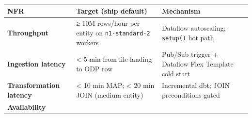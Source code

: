 \documentclass[
  11pt,
  british,
  oneside]{book}
\begin{document}
\begin{longtable}[]{@{}lll@{}}
\toprule
\begin{minipage}[b]{0.30\columnwidth}\raggedright
NFR\strut
\end{minipage} & \begin{minipage}[b]{0.30\columnwidth}\raggedright
Target (ship default)\strut
\end{minipage} & \begin{minipage}[b]{0.30\columnwidth}\raggedright
Mechanism\strut
\end{minipage}\tabularnewline
\midrule
\endhead
\begin{minipage}[t]{0.30\columnwidth}\raggedright
\textbf{Throughput}\strut
\end{minipage} & \begin{minipage}[t]{0.30\columnwidth}\raggedright
≥ 10M rows/hour per entity on \texttt{n1-standard-2} workers\strut
\end{minipage} & \begin{minipage}[t]{0.30\columnwidth}\raggedright
Dataflow autoscaling; \texttt{setup()} hot path\strut
\end{minipage}\tabularnewline
\begin{minipage}[t]{0.30\columnwidth}\raggedright
\textbf{Ingestion latency}\strut
\end{minipage} & \begin{minipage}[t]{0.30\columnwidth}\raggedright
\textless{} 5 min from file landing to ODP row\strut
\end{minipage} & \begin{minipage}[t]{0.30\columnwidth}\raggedright
Pub/Sub trigger + Dataflow Flex Template cold start\strut
\end{minipage}\tabularnewline
\begin{minipage}[t]{0.30\columnwidth}\raggedright
\textbf{Transformation latency}\strut
\end{minipage} & \begin{minipage}[t]{0.30\columnwidth}\raggedright
\textless{} 10 min MAP; \textless{} 20 min JOIN (medium entity)\strut
\end{minipage} & \begin{minipage}[t]{0.30\columnwidth}\raggedright
Incremental dbt; JOIN preconditions gated\strut
\end{minipage}\tabularnewline
\begin{minipage}[t]{0.30\columnwidth}\raggedright
\textbf{Availability}\strut
\end{minipage} & \begin{minipage}[t]{0.30\columnwidth}\raggedright

\end{minipage}
\end{longtable}
\end{document}
